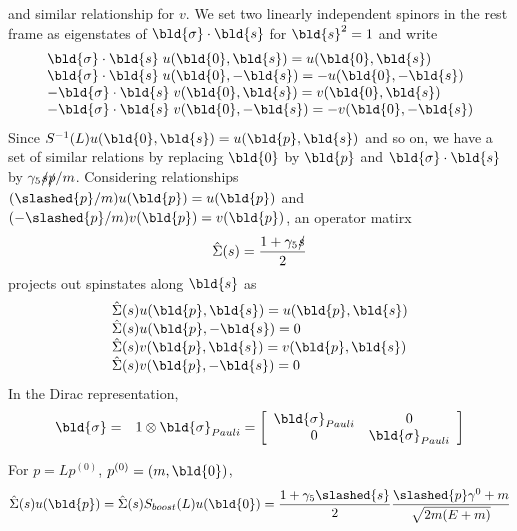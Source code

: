 and similar relationship for $v$. We set two linearly independent spinors 
in the rest frame as eigenstates of $\bld{\sigma}\cdot \bld{s}$ 
for $\bld{s}^2 = 1$
and write
\begin{eqnarray}
\begin{array}{l}
\bld{\sigma}\cdot \bld{s}\; u(\bld{0}, \bld{s} ) = u(\bld{0}, \bld{s} )
\\
\bld{\sigma}\cdot \bld{s}\; u(\bld{0}, -\bld{s} ) = -u(\bld{0}, -\bld{s} )
\\
- \bld{\sigma}\cdot \bld{s}\; v(\bld{0}, \bld{s} ) =  v(\bld{0}, \bld{s} )
\\
- \bld{\sigma}\cdot \bld{s}\; v(\bld{0}, -\bld{s} ) =  - v(\bld{0}, -\bld{s} )
\end{array}
\end{eqnarray}
Since $S^{-1}(L) u(\bld{0},\bld{s}) = u(\bld{p},\bld{s})$ and so on, we have
a set of similar relations by replacing $\bld{0}$ by $\bld{p}$ and
$\bld{\sigma}\cdot \bld{s}$ by $\gamma_5 \slashed{s} \slashed{p} / m$.
Considering relationships $(\slashed{p}/m)u(\bld{p}) = u(\bld{p})$
and $(-\slashed{p}/m)v(\bld{p}) = v(\bld{p})$, an operator matirx
\begin{eqnarray}
\hat{\Sigma}(s)
 = 
\frac{1 + \gamma_5 \slashed{s}}{2}
 \end{eqnarray}
projects out 
spinstates along $\bld{s}$ as
\begin{eqnarray}
\begin{array}{l}
\hat{\Sigma}(s) u(\bld{p}, \bld{s}) = u(\bld{p}, \bld{s})
\\
\hat{\Sigma}(s) u(\bld{p}, -\bld{s}) = 0
\\
\hat{\Sigma}(s) v(\bld{p}, \bld{s}) = v(\bld{p}, \bld{s})
\\
\hat{\Sigma}(s) v(\bld{p}, -\bld{s}) = 0
\end{array}
\end{eqnarray}
In the Dirac representation,
\begin{eqnarray}
\bld{\sigma}
&=&
1 \otimes \bld{\sigma}_{Pauli}
=
\left[
\begin{array}{cc}
\bld{\sigma}_{Pauli} & 0 \\
0 & \bld{\sigma}_{Pauli}
\end{array}
\right]
\end{eqnarray}


\bigskip

For $p = Lp^{(0)}$, $p^{(0)} = (m, \bld{0})$,
\begin{eqnarray}
\hat{\Sigma}(s) u(\bld{p})
=
\hat{\Sigma}(s)
S_{boost}(L)
u(\bld{0})
=
\frac{1 + \gamma_5 \slashed{s}}{2}
\frac{\slashed{p}\gamma^0 + m}{\sqrt{2m(E+m)}}
\end{eqnarray}


